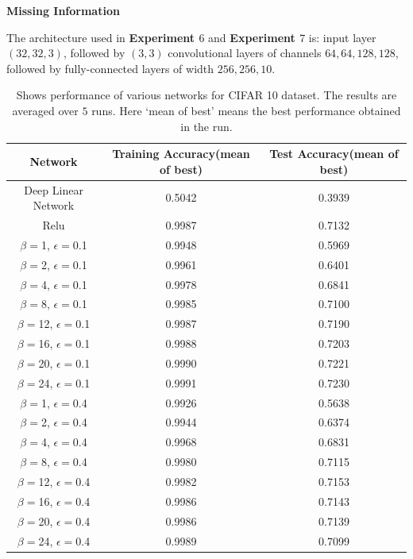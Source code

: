 {\textbf{Missing Information} 

The architecture used in \textbf{Experiment $6$} and \textbf{Experiment $7$} is: input layer $(32,32,3)$, followed by $(3,3)$ convolutional layers of channels $64,64,128,128$, followed by fully-connected layers of width $256,256,10$. 

\FloatBarrier
\begin{table}[h]
\centering
\begin{tabular}{|c|c|c|}\hline
Network
&Training Accuracy(mean of best)
&Test Accuracy(mean of best)\\\hline
Deep Linear Network
&0.5042
&0.3939\\\hline
Relu
&0.9987
&0.7132\\\hline

$\beta=$1, $\epsilon=$0.1
&0.9948
&0.5969\\\hline
$\beta=$2, $\epsilon=$0.1
&0.9961
&0.6401\\\hline
$\beta=$4, $\epsilon=$0.1
&0.9978
&0.6841\\\hline
$\beta=$8, $\epsilon=$0.1
&0.9985
&0.7100\\\hline
$\beta=$12, $\epsilon=$0.1
&0.9987
&0.7190\\\hline
$\beta=$16, $\epsilon=$0.1
&0.9988
&0.7203\\\hline
$\beta=$20, $\epsilon=$0.1
&0.9990
&0.7221\\\hline
$\beta=$24, $\epsilon=$0.1
&0.9991
&0.7230\\\hline
$\beta=$1, $\epsilon=$0.4
&0.9926
&0.5638\\\hline
$\beta=$2, $\epsilon=$0.4
&0.9944
&0.6374\\\hline
$\beta=$4, $\epsilon=$0.4
&0.9968
&0.6831\\\hline
$\beta=$8, $\epsilon=$0.4
&0.9980
&0.7115\\\hline
$\beta=$12, $\epsilon=$0.4
&0.9982
&0.7153\\\hline
$\beta=$16, $\epsilon=$0.4
&0.9986
&0.7143\\\hline
$\beta=$20, $\epsilon=$0.4
&0.9986
&0.7139\\\hline
$\beta=$24, $\epsilon=$0.4
&0.9989
&0.7099\\\hline
\end{tabular}
\caption{Shows performance of various networks for CIFAR 10 dataset. The results are averaged over $5$ runs. Here `mean of best' means the best performance obtained in the run.}
\label{tb:cifar}
\end{table}

\newpage


\newpage
}

